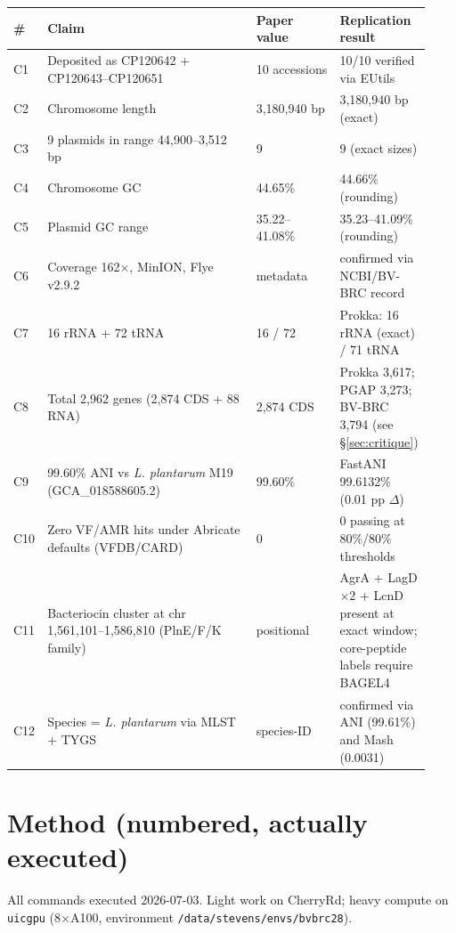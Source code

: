 \documentclass[11pt,a4paper]{article}
\begin{document}
\begin{longtable}{@{}p{0.05\linewidth}p{0.5\linewidth}p{0.2\linewidth}p{0.18\linewidth}@{}}
\toprule
\# & Claim & Paper value & Replication result \\
\midrule
\endhead
C1  & Deposited as CP120642 + CP120643--CP120651 & 10 accessions & 10/10 verified via EUtils \\
C2  & Chromosome length & 3{,}180{,}940 bp & 3{,}180{,}940 bp (exact) \\
C3  & 9 plasmids in range 44{,}900--3{,}512 bp & 9 & 9 (exact sizes) \\
C4  & Chromosome GC & 44.65\% & 44.66\% (rounding) \\
C5  & Plasmid GC range & 35.22--41.08\% & 35.23--41.09\% (rounding) \\
C6  & Coverage 162$\times$, MinION, Flye v2.9.2 & metadata & confirmed via NCBI/BV-BRC record \\
C7  & 16 rRNA + 72 tRNA & 16 / 72 & Prokka: 16 rRNA (exact) / 71 tRNA \\
C8  & Total 2{,}962 genes (2{,}874 CDS + 88 RNA) & 2{,}874 CDS & Prokka 3{,}617; PGAP 3{,}273; BV-BRC 3{,}794 (see \S \ref{sec:critique}) \\
C9  & 99.60\% ANI vs \textit{L. plantarum} M19 (GCA\_018588605.2) & 99.60\% & FastANI 99.6132\% (0.01 pp $\Delta$) \\
C10 & Zero VF/AMR hits under Abricate defaults (VFDB/CARD) & 0 & 0 passing at 80\%/80\% thresholds \\
C11 & Bacteriocin cluster at chr 1{,}561{,}101--1{,}586{,}810 (PlnE/F/K family) & positional & AgrA + LagD$\times$2 + LcnD present at exact window; core-peptide labels require BAGEL4 \\
C12 & Species = \textit{L. plantarum} via MLST + TYGS & species-ID & confirmed via ANI (99.61\%) and Mash (0.0031) \\
\bottomrule
\end{longtable}

\section{Method (numbered, actually executed)}

All commands executed 2026-07-03. Light work on CherryRd; heavy compute on
\texttt{uicgpu} (8$\times$A100, environment \verb|/data/stevens/envs/bvbrc28|).
\end{document}
